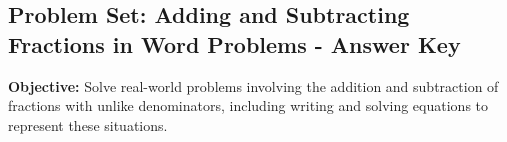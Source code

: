 \documentclass[11pt]{article}
\title{}
\date{}
\begin{document}
\subsection*{Problem Set: Adding and Subtracting Fractions in Word Problems - Answer Key}
\onehalfspacing

\begin{tcolorbox}[colframe=black!40, colback=gray!5, 
coltitle=black, colbacktitle=black!20, fonttitle=\bfseries\Large, 
title=Learning Objective, halign title=center, left=5pt, right=5pt, top=5pt, bottom=15pt]
\textbf{Objective:} Solve real-world problems involving the addition and subtraction of fractions with unlike denominators, including writing and solving equations to represent these situations.
\end{tcolorbox}
\end{document}

